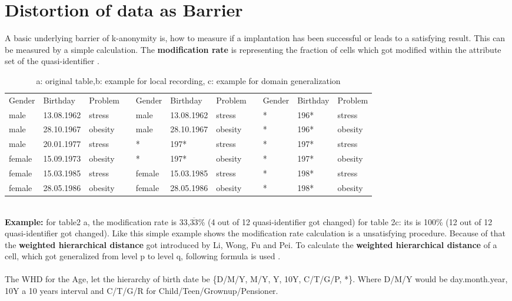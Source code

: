 \documentclass{llncs}
\begin{document}
\section{Distortion of data as Barrier} 
A basic underlying barrier of k-anonymity is, how to measure if a implantation has been successful or leads to a satisfying result. This can be measured by a simple calculation.
The \textbf{modification rate} is representing the fraction of cells which got modified within the attribute set of the quasi-identifier \cite{li2006achieving}.
\begin{table}[]
	\centering
	\label{table2}
	\caption{a: original table,b: example for local recording, c: example for domain generalization }
	\begin{tabular}{lllllllllll}
		\cline{1-3} \cline{5-7} \cline{9-11}
		Gender & Birthday   & Problem &  & Gender & Birthday   & Problem &  & Gender & Birthday & Problem \\ \cline{1-3} \cline{5-7} \cline{9-11} 
		male   & 13.08.1962 & stress  &  & male   & 13.08.1962 & stress  &  & *      & 196*     & stress  \\
		male   & 28.10.1967 & obesity &  & male   & 28.10.1967 & obesity &  & *      & 196*     & obesity \\
		male   & 20.01.1977 & stress  &  & *      & 197*       & stress  &  & *      & 197*     & stress  \\
		female & 15.09.1973 & obesity &  & *      & 197*       & obesity &  & *      & 197*     & obesity \\
		female & 15.03.1985 & stress  &  & female & 15.03.1985 & stress  &  & *      & 198*     & stress  \\
		female & 28.05.1986 & obesity &  & female & 28.05.1986 & obesity &  & *      & 198*     & obesity \\ \cline{1-3} \cline{5-7} \cline{9-11}
	\end{tabular}
	
\end{table}\\
\textbf{Example:} for table2 a, the modification rate is  33,$\overline{33}$\% (4 out of 12 quasi-identifier got changed) for table 2c: its is 100\% (12 out of 12 quasi-identifier got changed). Like this simple example shows the modification rate calculation is a unsatisfying procedure. Because of that the \textbf{weighted hierarchical distance} got introduced by Li, Wong, Fu and Pei. 
To calculate the \textbf{weighted hierarchical distance} of a cell, which got generalized from level p to level q, following formula is used \cite{li2006achieving}.\\
\\
The WHD for the Age, let the hierarchy of birth date be \{D/M/Y, M/Y, Y, 10Y, C/T/G/P, *\}. Where D/M/Y  would be day.month.year, 10Y a 10 years interval and C/T/G/R for Child/Teen/Grownup/Pensioner.\\
\end{document}

